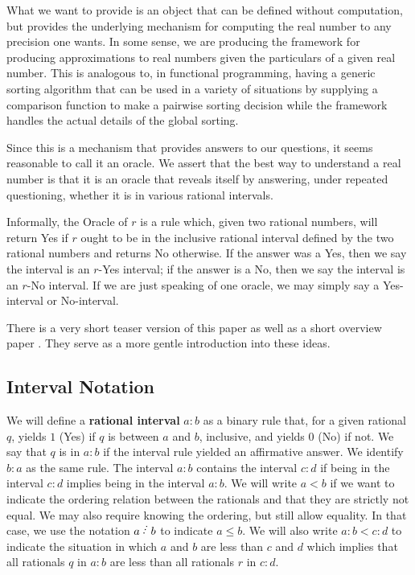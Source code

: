 \documentclass[12pt]{article}
\begin{document}
What we want to provide is an object that can be defined without computation, but provides the underlying mechanism for computing the real number to any precision one wants. In some sense, we are producing the framework for producing approximations to real numbers given the particulars of a given real number.  This is analogous to, in functional programming,  having a generic sorting algorithm that can be used in a variety of situations by supplying a comparison function to make a pairwise sorting decision while the framework handles the actual details of the global sorting.

Since this is a mechanism that provides answers to our questions, it seems reasonable to call it an oracle. We assert that the best way to understand a real number is that it is an oracle that reveals itself by answering, under repeated questioning, whether it is in various rational intervals. 

Informally, the Oracle of $r$ is a rule which, given two rational numbers, will return Yes if $r$ ought to be in the inclusive rational interval defined by the two rational numbers and returns No otherwise. If the answer was a Yes, then we say the interval is an $r$-Yes interval; if the answer is a No, then we say the interval is an $r$-No interval.  If we are just speaking of one oracle, we may simply say a Yes-interval or No-interval. 

There is a very short teaser version of this paper \cite{taylor23teaser} as well as a short overview paper \cite{taylor23over}. They serve as a more gentle introduction into these ideas. 

\subsection{Interval Notation}

We will define a \textbf{rational interval} $a:b$ as a binary rule that, for a given rational $q$, yields $1$ (Yes) if $q$ is between $a$ and $b$, inclusive, and yields $0$ (No) if not. We say that $q$ is in $a:b$ if the interval rule yielded an affirmative answer.  We identify $b:a$ as the same rule. The interval $a:b$ contains the interval $c:d$ if being in the interval $c:d$ implies being in the interval $a:b$. We will write $a\lt b$ if we want to indicate the ordering relation between the rationals and that they are strictly not equal. We may also require knowing the ordering, but still allow equality. In that case, we use the notation $a \lte b$ to indicate $a \leq b$.  We will also write $a:b < c:d$ to indicate the situation in which $a$ and $b$ are less than $c$ and $d$ which implies that all rationals $q$ in $a:b$ are less than all rationals $r$ in $c:d$.
\end{document}
